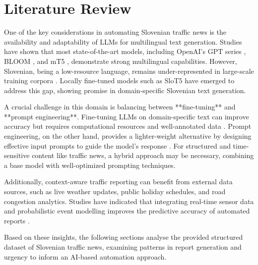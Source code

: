 \section*{Literature Review} 
One of the key considerations in automating Slovenian traffic news is the availability and adaptability of LLMs for multilingual text generation. Studies have shown that most state-of-the-art models, including OpenAI’s GPT series \cite{brown2020language}, BLOOM \cite{scao2022bloom}, and mT5 \cite{xue2021mt5}, demonstrate strong multilingual capabilities. However, Slovenian, being a low-resource language, remains under-represented in large-scale training corpora \cite{ulcar2021sloberta}. Locally fine-tuned models such as SloT5 \cite{ulcar2022slot5} have emerged to address this gap, showing promise in domain-specific Slovenian text generation.

A crucial challenge in this domain is balancing between **fine-tuning** and **prompt engineering**. Fine-tuning LLMs on domain-specific text can improve accuracy but requires computational resources and well-annotated data \cite{zhang2022fine}. Prompt engineering, on the other hand, provides a lighter-weight alternative by designing effective input prompts to guide the model’s response \cite{reynolds2021prompt}. For structured and time-sensitive content like traffic news, a hybrid approach may be necessary, combining a base model with well-optimized prompting techniques.

Additionally, context-aware traffic reporting can benefit from external data sources, such as live weather updates, public holiday schedules, and road congestion analytics. Studies have indicated that integrating real-time sensor data and probabilistic event modelling improves the predictive accuracy of automated reports \cite{schelter2019automated}.

Based on these insights, the following sections analyse the provided structured dataset of Slovenian traffic news, examining patterns in report generation and urgency to inform an AI-based automation approach.
